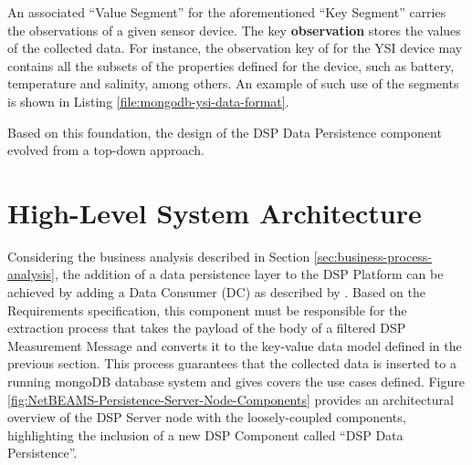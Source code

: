 An associated ``Value Segment'' for the aforementioned ``Key Segment'' carries
the observations of a given sensor device. The key \textbf{observation} stores
the values of the collected data. For instance, the observation key of
for the YSI device \cite{YSI-Sonde} may contains all the subsets of 
the properties defined for the device, such as battery, temperature and
salinity, among others. An example of such use of the segments is shown in
Listing \ref{file:mongodb-ysi-data-format}.

Based on this foundation, the design of the DSP Data Persistence component
evolved from a top-down approach.

\section{High-Level System Architecture}

Considering the business analysis described in Section
\ref{sec:business-process-analysis}, the addition of a data persistence layer
to the DSP Platform can be achieved by adding a Data Consumer (DC) as 
described by \cite{netbeams-dsp-architecture}. Based on the 
Requirements specification, this component must be responsible for the 
extraction process that takes the payload of the body of a filtered DSP
Measurement Message and converts it to the key-value data model defined
in the previous section. This process guarantees that the collected data is
inserted to a running mongoDB database system and gives covers the use cases
defined. Figure \ref{fig:NetBEAMS-Persistence-Server-Node-Components}
provides an architectural overview of the DSP Server node with the
loosely-coupled components, highlighting the inclusion of a new DSP Component
called ``DSP Data Persistence''.

